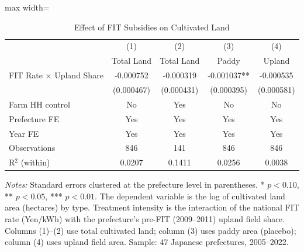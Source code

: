 \begin{table}[H]
\centering
\caption{Effect of FIT Subsidies on Cultivated Land}
\begin{threeparttable}
\begin{adjustbox}{max width=\textwidth}
\begin{tabular}{lcccc}
\toprule
 & (1) & (2) & (3) & (4) \\
 & Total Land & Total Land & Paddy & Upland \\
\midrule
FIT Rate $\times$ Upland Share & -0.000752 & -0.000319 & -0.001037** & -0.000535 \\
 & (0.000467) & (0.000431) & (0.000395) & (0.000581) \\
\addlinespace
Farm HH control & No & Yes & No & No \\
Prefecture FE & Yes & Yes & Yes & Yes \\
Year FE & Yes & Yes & Yes & Yes \\
Observations & 846 & 141 & 846 & 846 \\
R$^2$ (within) & 0.0207 & 0.1411 & 0.0256 & 0.0038 \\
\bottomrule
\end{tabular}
\end{adjustbox}
\begin{tablenotes}[flushleft]
\small
\item \textit{Notes:} Standard errors clustered at the prefecture level in parentheses. * $p<0.10$, ** $p<0.05$, *** $p<0.01$. The dependent variable is the log of cultivated land area (hectares) by type. Treatment intensity is the interaction of the national FIT rate (Yen/kWh) with the prefecture's pre-FIT (2009--2011) upland field share. Columns (1)--(2) use total cultivated land; column (3) uses paddy area (placebo); column (4) uses upland field area. Sample: 47 Japanese prefectures, 2005--2022.
\end{tablenotes}
\end{threeparttable}
\label{tab:main}
\end{table}

